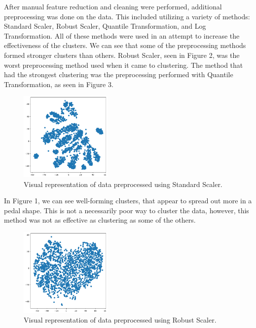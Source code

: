 \documentclass[twocolumn]{article}
\begin{document}
After manual feature reduction and cleaning were performed, additional preprocessing was done on the data. This included utilizing
a variety of methods: Standard Scaler, Robust Scaler, Quantile Transformation, and Log Transformation. All of these methods were used 
in an attempt to increase the effectiveness of the clusters. We can see that some of the preprocessing methods formed stronger clusters than others. Robust Scaler, seen in Figure 2, was the worst preprocessing method used when it came to clustering. The method that had the strongest clustering was the preprocessing performed with Quantile Transformation, as seen in Figure 3.

\begin{figure}
    \centering
    \includegraphics[width=0.4\textwidth]{images/standard_scaler.png}
    \caption{Visual representation of data preprocessed using Standard Scaler.}
\end{figure}

In Figure 1, we can see well-forming clusters, that appear to spread out more in a pedal shape. This is not a necessarily poor way to cluster the data, however, this method was not as effective as clustering as some of the others.

\begin{figure}
    \centering
    \includegraphics[width=0.4\textwidth]{images/robust_scaler.png}
    \caption{Visual representation of data preprocessed using Robust Scaler.}
\end{figure}
\end{document}
